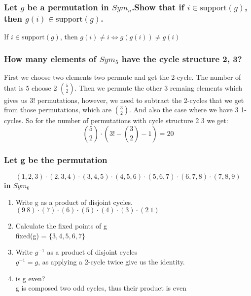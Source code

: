 \subsubsection{}

\subsubsection{}

\subsubsection{}

\subsubsection{}

\subsubsection{Let $g$ be a permutation in $Sym_n$.Show that if $i\in \text{support}(g)$, then $g(i) \in \text{support}(g)$.}
If $i \in \text{support}(g)$, then $g(i) \ne i \iff g(g(i)) \ne g(i)$

\subsubsection{How many elements of $Sym_5$ have the cycle structure 2, 3?}
First we choose two elements two permute and get the 2-cycle. The number of that
is 5 choose 2 $5 \choose 2$. Then we permute the other 3 remaing elements which gives us
$3!$ permutations, however, we need to subtract the 2-cycles that we get from those permutations,
which are $3 \choose 2$. And also the case where we have 3 1-cycles. \newline
So for the number of permutations with cycle structure 2 3 we get:
$$ {5 \choose 2} \cdot \left(3! - {3 \choose 2} - 1\right) = 20$$

\subsubsection{Let g be the permutation}
$$ (1,2,3)\cdot(2,3,4)\cdot(3,4,5)\cdot(4,5,6)\cdot(5,6,7)\cdot(6,7,8)\cdot(7,8,9) $$
\textbf{in $Sym_6$}

\begin{enumerate}[label=(\alph*)]
    \item Write g as a product of disjoint cycles. \\
    $(9 \ 8) \cdot (7) \cdot (6) \cdot (5) \cdot (4) \cdot (3) \cdot (2 \ 1)$
    \item Calculate the fixed points of g  \\
    fixed(g) = $\{3,4,5,6,7\}$
    \item Write $g^{-1}$ as a product of disjoint cycles \\
    $g^{-1} = g$, as applying a 2-cycle twice give us the identity.
    \item is g even? \\
    g is composed two odd cycles, thus their product is even
\end{enumerate}


